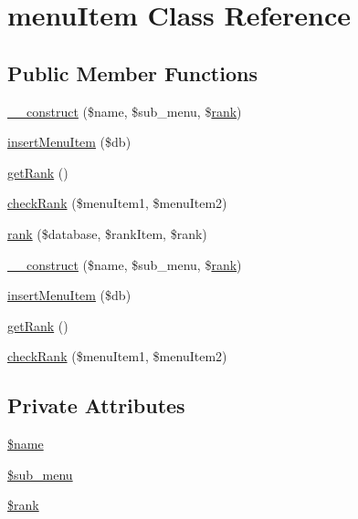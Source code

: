 \hypertarget{classmenu_item}{}\section{menu\+Item Class Reference}
\label{classmenu_item}
\subsection*{Public Member Functions}
\begin{DoxyCompactItemize}
\item 
\mbox{\hyperlink{classmenu_item_ac2e0d6bcd4cb3d9ca84657a9e22f0f77}{\+\_\+\+\_\+construct}} (\$name, \$sub\+\_\+menu, \$\mbox{\hyperlink{classmenu_item_a11a35df540c2459bb27cac28ac859060}{rank}})
\item 
\mbox{\hyperlink{classmenu_item_a6664535b603af81a6228831db704ae33}{insert\+Menu\+Item}} (\$db)
\item 
\mbox{\hyperlink{classmenu_item_ad9b18cc3c110ea0dc7bd67a701d12a92}{get\+Rank}} ()
\item 
\mbox{\hyperlink{classmenu_item_ad882625e735534b2fee1711a303cab6e}{check\+Rank}} (\$menu\+Item1, \$menu\+Item2)
\item 
\mbox{\hyperlink{classmenu_item_a11a35df540c2459bb27cac28ac859060}{rank}} (\$database, \$rank\+Item, \$rank)
\item 
\mbox{\hyperlink{classmenu_item_ac2e0d6bcd4cb3d9ca84657a9e22f0f77}{\+\_\+\+\_\+construct}} (\$name, \$sub\+\_\+menu, \$\mbox{\hyperlink{classmenu_item_a11a35df540c2459bb27cac28ac859060}{rank}})
\item 
\mbox{\hyperlink{classmenu_item_a6664535b603af81a6228831db704ae33}{insert\+Menu\+Item}} (\$db)
\item 
\mbox{\hyperlink{classmenu_item_ad9b18cc3c110ea0dc7bd67a701d12a92}{get\+Rank}} ()
\item 
\mbox{\hyperlink{classmenu_item_ad882625e735534b2fee1711a303cab6e}{check\+Rank}} (\$menu\+Item1, \$menu\+Item2)
\end{DoxyCompactItemize}
\subsection*{Private Attributes}
\begin{DoxyCompactItemize}
\item 
\mbox{\hyperlink{classmenu_item_ab2fc40d43824ea3e1ce5d86dee0d763b}{\$name}}
\item 
\mbox{\hyperlink{classmenu_item_a7ad2a428204c695c6894378e0dd5d069}{\$sub\+\_\+menu}}
\item 
\mbox{\hyperlink{classmenu_item_a00d75d16bd24d5beb60fee3ab20fc5b6}{\$rank}}
\end{DoxyCompactItemize}


